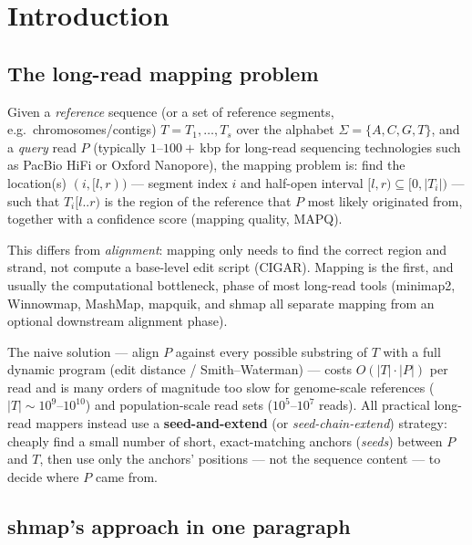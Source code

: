 \chapter{Introduction}

\section{The long-read mapping problem}

Given a \emph{reference} sequence (or a set of reference segments, e.g.\ chromosomes/contigs)
$T = T_1, \dots, T_s$ over the alphabet $\Sigma = \{A, C, G, T\}$, and a \emph{query} read $P$
(typically $1$--$100+$\,kbp for long-read sequencing technologies such as PacBio HiFi or Oxford
Nanopore), the mapping problem is: find the location(s) $(i, [l, r))$ --- segment index $i$ and
half-open interval $[l, r) \subseteq [0, |T_i|)$ --- such that $T_i[l..r)$ is the region of the
reference that $P$ most likely originated from, together with a confidence score (mapping
quality, MAPQ).

This differs from \emph{alignment}: mapping only needs to find the correct region and strand, not
compute a base-level edit script (CIGAR). Mapping is the first, and usually the computational
bottleneck, phase of most long-read tools (minimap2, Winnowmap, MashMap, mapquik, and shmap all
separate mapping from an optional downstream alignment phase).

The naive solution --- align $P$ against every possible substring of $T$ with a full dynamic
program (edit distance / Smith--Waterman) --- costs $O(|T|\cdot|P|)$ per read and is many orders
of magnitude too slow for genome-scale references ($|T| \sim 10^9$--$10^{10}$) and
population-scale read sets ($10^5$--$10^7$ reads). All practical long-read mappers instead use a
\textbf{seed-and-extend} (or \emph{seed-chain-extend}) strategy: cheaply find a small number of
short, exact-matching anchors (\emph{seeds}) between $P$ and $T$, then use only the anchors'
positions --- not the sequence content --- to decide where $P$ came from.

\section{shmap's approach in one paragraph}

